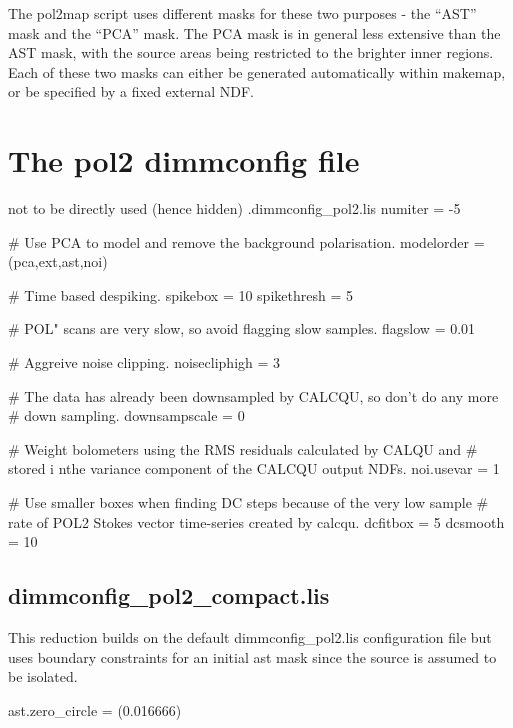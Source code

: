 The pol2map script uses different masks for these two purposes - the “AST” mask and the “PCA” mask. 
The PCA mask is in general less extensive than the AST mask, with the source areas being restricted to the brighter inner regions.
Each of these two masks can either be generated automatically within makemap, or be specified by
a fixed external NDF. 


\section{The pol2 dimmconfig file}
\label{sec:config}



not to be directly used (hence hidden) .dimmconfig\_pol2.lis
numiter = -5




\begin{terminalv}
#  Use PCA to model and remove the  background polarisation.
   modelorder = (pca,ext,ast,noi)

#  Time based despiking.
   spikebox = 10
   spikethresh = 5

#  POL" scans are very slow, so avoid flagging slow samples.
   flagslow = 0.01

#  Aggreive noise clipping.
   noisecliphigh = 3

#  The data has already been downsampled by CALCQU, so don't  do any more
#  down sampling.
   downsampscale = 0

#  Weight bolometers using the RMS residuals calculated by CALQU and
#  stored i nthe variance component of the CALCQU output NDFs.
   noi.usevar = 1

#  Use smaller boxes when finding DC steps because of the very low sample
#  rate of POL2 Stokes vector time-series created by calcqu.
   dcfitbox = 5
   dcsmooth = 10
\end{terminalv}


\subsection{dimmconfig\_pol2\_compact.lis}

This reduction builds on the default dimmconfig\_pol2.lis configuration file but uses boundary 
constraints for an initial ast mask since the source is assumed to be isolated.


\begin{terminalv}
   ast.zero_circle = (0.016666)
\end{terminalv}


